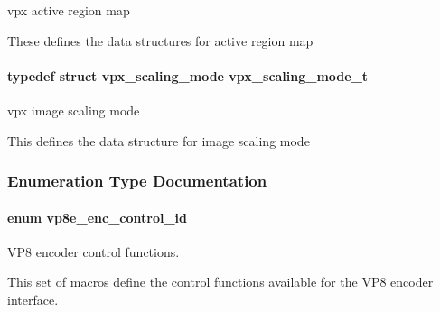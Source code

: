 vpx active region map 

\-These defines the data structures for active region map \hypertarget{group__vp8__encoder_ga9600359ed9096cd96c621d9cf6c8df38}{
\paragraph[{vpx\-\_\-scaling\-\_\-mode\-\_\-t}]{\setlength{\rightskip}{0pt plus 5cm}typedef struct {\bf vpx\-\_\-scaling\-\_\-mode}  {\bf vpx\-\_\-scaling\-\_\-mode\-\_\-t}}}
\label{group__vp8__encoder_ga9600359ed9096cd96c621d9cf6c8df38}


vpx image scaling mode 

\-This defines the data structure for image scaling mode 

\subsubsection{\-Enumeration \-Type \-Documentation}
\hypertarget{group__vp8__encoder_ga6deae3d561c838952552c3d3756322ec}{
\paragraph[{vp8e\-\_\-enc\-\_\-control\-\_\-id}]{\setlength{\rightskip}{0pt plus 5cm}enum {\bf vp8e\-\_\-enc\-\_\-control\-\_\-id}}}
\label{group__vp8__encoder_ga6deae3d561c838952552c3d3756322ec}


\-V\-P8 encoder control functions. 

\-This set of macros define the control functions available for the \-V\-P8 encoder interface.

